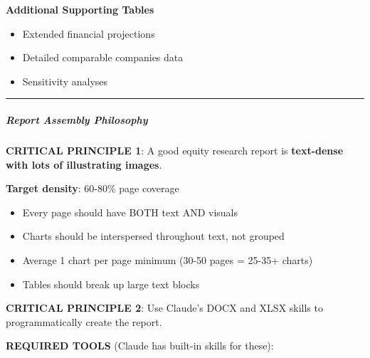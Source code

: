 \documentclass[11pt]{article}
\begin{document}
\textbf{Additional Supporting Tables}

\begin{itemize}[leftmargin=*,itemsep=2pt,topsep=2pt]
\item {} Extended financial projections
\item {} Detailed comparable companies data
\item {} Sensitivity analyses
\end{itemize}

\vspace{0.5em}\hrule\vspace{0.5em}

\subparagraph{Report Assembly Philosophy}\mbox{}\par

\textbf{CRITICAL PRINCIPLE 1}: A good equity research report is \textbf{text-dense with lots of illustrating images}.


\textbf{Target density}: 60-80\% page coverage

\begin{itemize}[leftmargin=*,itemsep=2pt,topsep=2pt]
\item {} Every page should have BOTH text AND visuals
\item {} Charts should be interspersed throughout text, not grouped
\item {} Average 1 chart per page minimum (30-50 pages = 25-35+ charts)
\item {} Tables should break up large text blocks
\end{itemize}

\textbf{CRITICAL PRINCIPLE 2}: Use Claude's DOCX and XLSX skills to programmatically create the report.


\textbf{REQUIRED TOOLS} (Claude has built-in skills for these):
\end{document}
